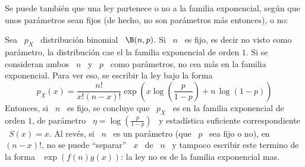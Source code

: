 Se puede tambi\'en que una ley  partenece o no a la familia exponencial, seg\'un
que unos par\'ametros sean fijos  (de hecho, no son par\'ametros m\'as entonces),
o no:
%
\begin{ejemplo}
  Sea \  $p_X$ \ distribuci\'on  binomial \  $\B(n,p)$. Si \  $n$ \ es  fijo, es
  decir  no  visto  como  par\'ametro,  la  distribuci\'on  cae  el  la  familia
  exponencial  de orden $1$.  Si se  consideran ambos  \ $n$  \ y  \ $p$  \ como
  par\'ametros,  no  cea m\'as  en  la familia  exponencial.  Para  ver eso,  se
  escribir la ley bajo la forma
  \[
  p_X(x) = \frac{n!}{x! (n-x)!}  \exp\left( x \log\left( \frac{p}{1-p}
    \right) + n \, \log(1-p) \right)
  \]
  Entonces, si  \ $n$  \ es fijo,  se concluye que  \ $p_X$  \ es en  la familia
  exponencial de  orden $1$, de  par\'ametro \ $\eta =  \log\left( \frac{p}{1-p}
  \right)$  \  y estad\'istica  suficiente  correspondiente  \  $S(x) =  x$.  Al
  rev\'es,  si \  $n$ \  es un  par\'ametro  (que \  $p$ \  sea fijo  o no),  en
  $(n-x)!$, no se puede  ``separar'' \ $x$ \ de \ $n$  \ y tampoco escribir este
  termino  de la  forma \  $\exp(  f(n) g(x)  )$: la  ley  no es  de la  familia
  exponencial mas.
\end{ejemplo}

